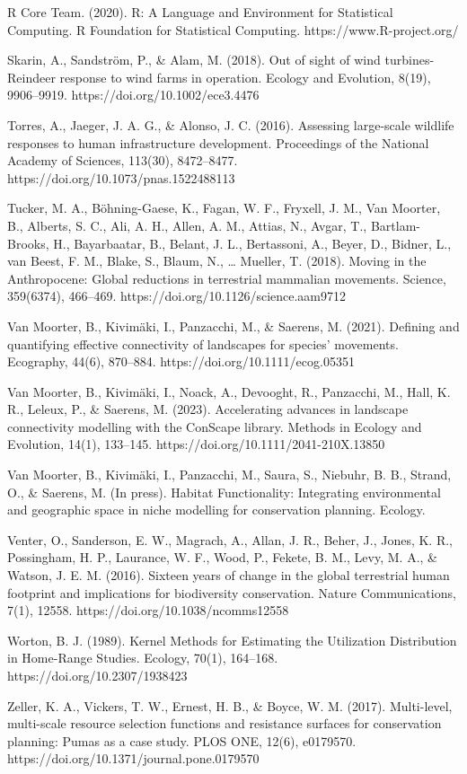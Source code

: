 \documentclass[titlepage]{article}
\begin{document}
R Core Team. (2020). R: A Language and Environment for Statistical Computing. R Foundation for Statistical Computing. https://www.R-project.org/

Skarin, A., Sandström, P., & Alam, M. (2018). Out of sight of wind turbines-Reindeer response to wind farms in operation. Ecology and Evolution, 8(19), 9906–9919. https://doi.org/10.1002/ece3.4476

Torres, A., Jaeger, J. A. G., & Alonso, J. C. (2016). Assessing large-scale wildlife responses to human infrastructure development. Proceedings of the National Academy of Sciences, 113(30), 8472–8477. https://doi.org/10.1073/pnas.1522488113

Tucker, M. A., Böhning-Gaese, K., Fagan, W. F., Fryxell, J. M., Van Moorter, B., Alberts, S. C., Ali, A. H., Allen, A. M., Attias, N., Avgar, T., Bartlam-Brooks, H., Bayarbaatar, B., Belant, J. L., Bertassoni, A., Beyer, D., Bidner, L., van Beest, F. M., Blake, S., Blaum, N., … Mueller, T. (2018). Moving in the Anthropocene: Global reductions in terrestrial mammalian movements. Science, 359(6374), 466–469. https://doi.org/10.1126/science.aam9712

Van Moorter, B., Kivimäki, I., Panzacchi, M., & Saerens, M. (2021). Defining and quantifying effective connectivity of landscapes for species’ movements. Ecography, 44(6), 870–884. https://doi.org/10.1111/ecog.05351

Van Moorter, B., Kivimäki, I., Noack, A., Devooght, R., Panzacchi, M., Hall, K. R., Leleux, P., & Saerens, M. (2023). Accelerating advances in landscape connectivity modelling with the ConScape library. Methods in Ecology and Evolution, 14(1), 133–145. https://doi.org/10.1111/2041-210X.13850

Van Moorter, B., Kivimäki, I., Panzacchi, M., Saura, S., Niebuhr, B. B., Strand, O., & Saerens, M. (In press). Habitat Functionality: Integrating environmental and geographic space in niche modelling for conservation planning. Ecology.

Venter, O., Sanderson, E. W., Magrach, A., Allan, J. R., Beher, J., Jones, K. R., Possingham, H. P., Laurance, W. F., Wood, P., Fekete, B. M., Levy, M. A., & Watson, J. E. M. (2016). Sixteen years of change in the global terrestrial human footprint and implications for biodiversity conservation. Nature Communications, 7(1), 12558. https://doi.org/10.1038/ncomms12558

Worton, B. J. (1989). Kernel Methods for Estimating the Utilization Distribution in Home-Range Studies. Ecology, 70(1), 164–168. https://doi.org/10.2307/1938423

Zeller, K. A., Vickers, T. W., Ernest, H. B., & Boyce, W. M. (2017). Multi-level, multi-scale resource selection functions and resistance surfaces for conservation planning: Pumas as a case study. PLOS ONE, 12(6), e0179570. https://doi.org/10.1371/journal.pone.0179570
\end{document}
